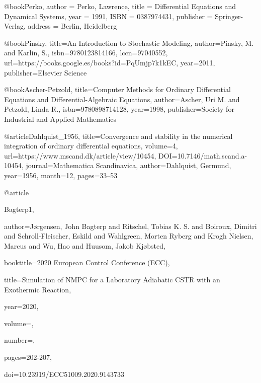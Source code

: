 @book{Perko,
    author = {Perko, Lawrence},
    title = {Differential Equations and Dynamical Systems},
    year = {1991},
    ISBN = {0387974431},
    publisher = {Springer-Verlag},
    address = {Berlin, Heidelberg}
}

@book{Pinsky,
  title={An Introduction to Stochastic Modeling},
  author={Pinsky, M. and Karlin, S.},
  isbn={9780123814166},
  lccn={97040552},
  url={https://books.google.es/books?id=PqUmjp7k1kEC},
  year={2011},
  publisher={Elsevier Science}
}

@book{Ascher-Petzold,
  title={Computer Methods for Ordinary Differential Equations and Differential-Algebraic Equations},
  author={Ascher, Uri M. and Petzold, Linda R.},
  isbn={9780898714128},
  year={1998},
  publisher={Society for Industrial and Applied Mathematics}
}

@article{Dahlquist_1956, title={Convergence and stability in the numerical integration of ordinary differential equations}, volume={4}, url={https://www.mscand.dk/article/view/10454}, DOI={10.7146/math.scand.a-10454}, journal={Mathematica Scandinavica}, author={Dahlquist, Germund}, year={1956}, month={12}, pages={33–53} 
}

@article{Bagterp1,

  author={Jørgensen, John Bagterp and Ritschel, Tobias K. S. and Boiroux, Dimitri and Schroll-Fleischer, Eskild and Wahlgreen, Morten Ryberg and Krogh Nielsen, Marcus and Wu, Hao and Huusom, Jakob Kjøbsted},

  booktitle={2020 European Control Conference (ECC)}, 

  title={Simulation of NMPC for a Laboratory Adiabatic CSTR with an Exothermic Reaction}, 

  year={2020},

  volume={},

  number={},

  pages={202-207},

  doi={10.23919/ECC51009.2020.9143733}
}

